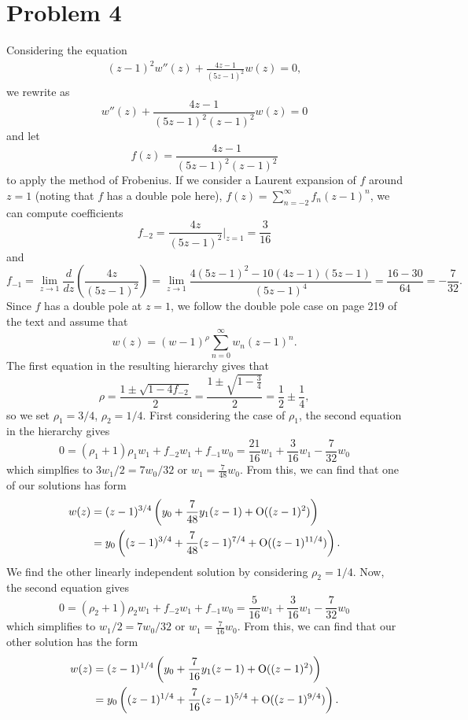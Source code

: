 \documentclass{article}
\begin{document}
\section{Problem 4}
Considering the equation
  \begin{align*}
    (z-1)^2 w''(z) + \frac{4 z -1}{(5z-1)^2} w(z) = 0,
  \end{align*}
we rewrite as
\[
w''(z) + \frac{4 z -1}{(5z-1)^2(z-1)^2} w(z) = 0
\]
and let 
\[
f(z)=\frac{4 z -1}{(5z-1)^2(z-1)^2}
\]
to apply the method of Frobenius. If we consider a Laurent expansion of $f$ around $z=1$ (noting that $f$ has a double pole here), $f(z)=\sum_{n=-2}^\infty f_n(z-1)^n$, we can compute coefficients
\[
f_{-2}=\frac{4z}{(5z-1)^2}\bigg|_{z=1}=\frac{3}{16}
\]
and 
\[
f_{-1}=\lim_{z\to 1}\frac{d}{dz}\left(\frac{4z}{(5z-1)^2}\right)=\lim_{z\to1}\frac{4(5z-1)^2-10(4z-1)(5z-1)}{(5z-1)^4}=\frac{16-30}{64}=-\frac{7}{32}.
\]
Since $f$ has a double pole at $z=1$, we follow the double pole case on page 219 of the text and assume that 
\[
w(z)=(w-1)^\rho\sum_{n=0}^\infty w_n(z-1)^n.
\]
The first equation in the resulting hierarchy gives that 
\[
\rho=\frac{1\pm\sqrt{1-4f_{-2}}}{2}=\frac{1\pm\sqrt{1-\frac{3}{4}}}{2}=\frac{1}{2}\pm\frac{1}{4},
\]
so we set $\rho_1=3/4$, $\rho_2=1/4$. First considering the case of $\rho_1$, the second equation in the hierarchy gives
\[
0=(\rho_1+1)\rho_1w_1+f_{-2}w_1+f_{-1}w_0=\frac{21}{16}w_1+\frac{3}{16}w_1-\frac{7}{32}w_0
\]
which simplfies to $3w_1/2=7w_0/32$ or $w_1=\frac{7}{48}w_0$. From this, we can find that one of our solutions has form
\begin{align*}
w(z)&=(z-1)^{3/4}\left(y_0+\frac{7}{48}y_1(z-1)+\operatorname{O}((z-1)^2)\right)\\&=
y_0\left((z-1)^{3/4}+\frac{7}{48}(z-1)^{7/4}+\operatorname{O}((z-1)^{11/4})\right).
\end{align*}
We find the other linearly independent solution by considering $\rho_2=1/4$. Now, the second equation gives
\[
0=(\rho_2+1)\rho_2w_1+f_{-2}w_1+f_{-1}w_0=\frac{5}{16}w_1+\frac{3}{16}w_1-\frac{7}{32}w_0
\]
which simplifies to $w_1/2=7w_0/32$ or $w_1=\frac{7}{16}w_0$. From this, we can find that our other solution has the form
\begin{align*}
w(z)&=(z-1)^{1/4}\left(y_0+\frac{7}{16}y_1(z-1)+\operatorname{O}((z-1)^2)\right)\\&=
y_0\left((z-1)^{1/4}+\frac{7}{16}(z-1)^{5/4}+\operatorname{O}((z-1)^{9/4})\right).
\end{align*}
\end{document}
